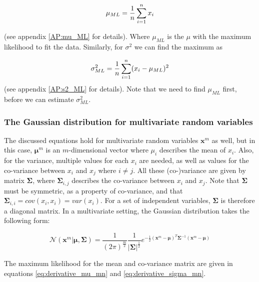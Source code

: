 \begin{equation}\label{eq:derivative_mu}
     \mu_{ML} = \frac{1}{n} \sum_{i=1}^{n} x_i\\
\end{equation}

(see appendix \ref{AP:mu_ML} for details).
Where $\mu_{ML}$ is the $\mu$ with the maximum likelihood to fit the data. Similarly, for $\sigma^2$ we can find the maximum as

\begin{equation}\label{eq:derivative_sigma}
    \sigma^2_{ML} = \frac{1}{n} \sum_{i=1}^{n} (x_i - \mu_{ML})^2\\
\end{equation}
(see appendix \ref{AP:s2_ML} for details).
Note that we need to find $\mu_{ML}$ first, before we can estimate $\sigma^2_{ML}$.

\subsubsection{The Gaussian distribution for multivariate random variables}


The discussed equations hold for multivariate random variables $\textbf{x}^m$ as well, but in this case, $\bm{\mu}^m$ is an $m$-dimensional vector where $\mu_i$ describes the mean of $x_i$. Also, for the variance, multiple values for each $x_i$ are needed, as well as values for the co-variance between $x_i$ and $x_j$ where $i\neq j$. All these (co-)variance are given by matrix $\bm{\Sigma}$, where $\bm{\Sigma}_{i,j}$ describes the co-variance between $x_i$ and $x_j$. Note that $\bm{\Sigma}$ must be symmetric, as a property of co-variance, and that $\bm{\Sigma}_{i,i}=cov(x_i,x_i) = var(x_i)$. For a set of independent variables, $\bm{\Sigma}$ is therefore a diagonal matrix. In a multivariate setting, the Gaussian distribution takes the following form:

\begin{equation}\label{eq:gaus_mn}
    \mathcal{N}(\textbf{x}^m|\bm{\mu}, \bm{\Sigma})=\frac{1}{(2 \pi)^{\frac{m}{2}}}\frac{1}{|\bm{\Sigma}|^{\frac{1}{2}}} e^{- \frac{1}{2}(\textbf{x}^m - \bm{\mu})^T \bm{\Sigma}^{-1}(\textbf{x}^m - \bm{\mu})}
\end{equation}


The maximum likelihood for the mean and co-variance matrix are given in equations \ref{eq:derivative_mu_mn} and \ref{eq:derivative_sigma_mn}.

